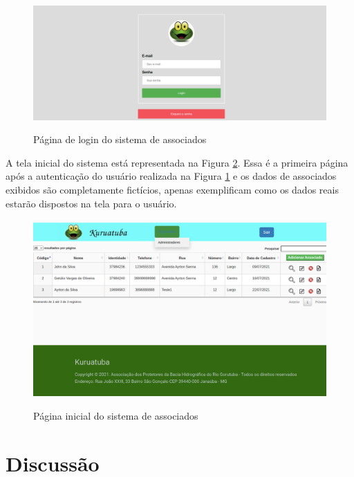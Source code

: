 \begin{figure}[htb]
 \centering
 \caption{Página de login do sistema de associados}
 \includegraphics[width=1\textwidth]{figuras/kuruatuba_sistema_login.png}
 \label{fig:login-sistema}
\end{figure}


A tela inicial do sistema está representada na Figura \ref{fig:home-sistema}. Essa é a primeira página após a autenticação do usuário realizada na Figura \ref{fig:login-sistema} e os dados de associados exibidos são completamente fictícios, apenas exemplificam como  os dados reais estarão dispostos na tela para o usuário.

\newpage

\begin{figure}[htb]
 \centering
 \caption{Página inicial do sistema de associados}
 \includegraphics[width=1\textwidth]{figuras/kuruatuba_sistema_home.png}
 \label{fig:home-sistema}
\end{figure}


\clearpage

\hspace{2.5cm}
\section{Discussão}
\hspace{2.5cm}

